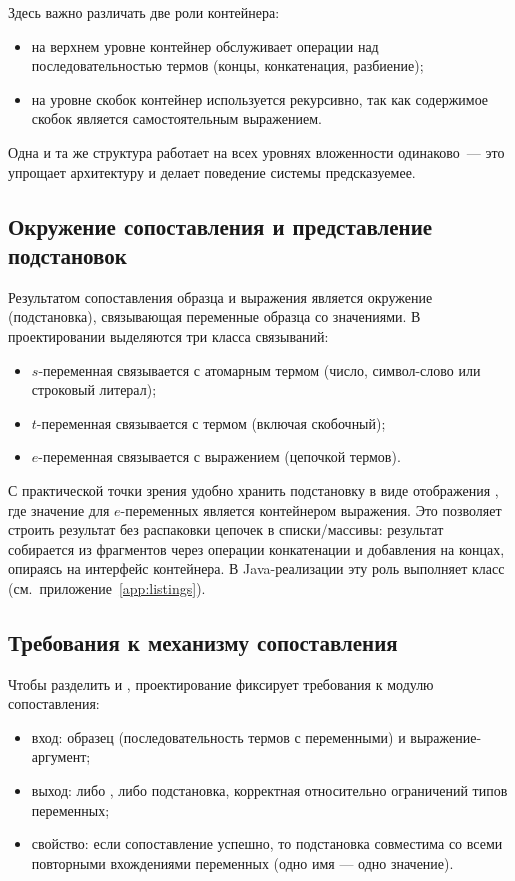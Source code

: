 Здесь важно различать две роли контейнера:
\begin{itemize}
  \item на верхнем уровне контейнер обслуживает операции над последовательностью термов (концы, конкатенация, разбиение);
  \item на уровне скобок контейнер используется рекурсивно, так как содержимое скобок является самостоятельным выражением.
\end{itemize}
Одна и та же структура работает на всех уровнях вложенности одинаково~--- это упрощает
архитектуру и делает поведение системы предсказуемее.

\subsection{Окружение сопоставления и представление подстановок}

Результатом сопоставления образца и выражения является окружение (подстановка), связывающая переменные образца со значениями.
В проектировании выделяются три класса связываний:
\begin{itemize}
  \item \(s\)-переменная связывается с атомарным термом (число, символ-слово или строковый литерал);
  \item \(t\)-переменная связывается с термом (включая скобочный);
  \item \(e\)-переменная связывается с выражением (цепочкой термов).
\end{itemize}

С практической точки зрения удобно хранить подстановку в виде отображения , где значение
для \(e\)-переменных является контейнером выражения. Это позволяет строить результат без распаковки цепочек в списки/массивы:
результат собирается из фрагментов через операции конкатенации и добавления на концах, опираясь на интерфейс контейнера.
В Java-реализации эту роль выполняет класс  (см.~приложение~\ref{app:listings}).

\subsection{Требования к механизму сопоставления}

Чтобы разделить  и , проектирование фиксирует требования к модулю сопоставления:
\begin{itemize}
  \item вход: образец (последовательность термов с переменными) и выражение-аргумент;
  \item выход: либо , либо подстановка, корректная относительно ограничений типов переменных;
  \item свойство: если сопоставление успешно, то подстановка совместима со всеми повторными вхождениями переменных (одно имя --- одно значение).
\end{itemize}

